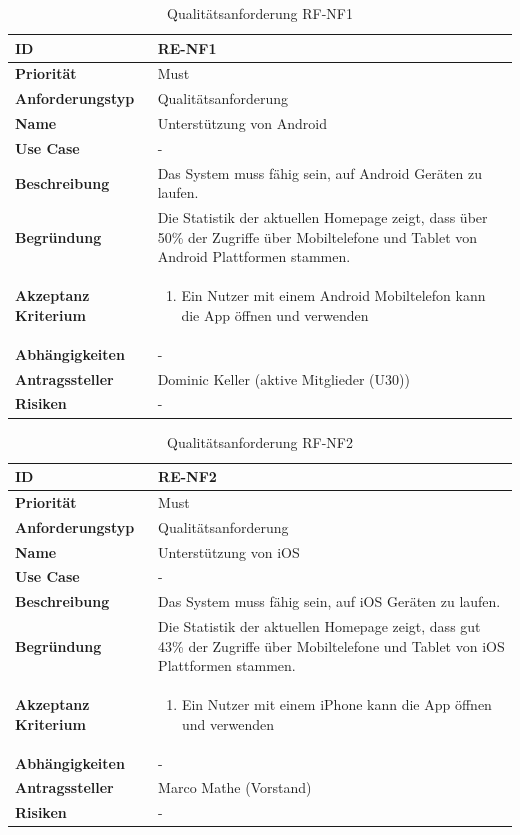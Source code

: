 \begin{table}[ht]
\centering
  \begin{tabular}{ l | p{8cm} }
	\hline
	\rowcolor{gray}
	\textbf{ID} 			&	\textbf{RE-NF1}\\ \hline
	\textbf{Priorität} 		&	Must\\ \hline
	\textbf{Anforderungstyp}	&	Qualitätsanforderung\\ \hline
	\textbf{Name} 			&	Unterstützung von Android\\ \hline
	\textbf{Use Case} 		&	-\\ \hline
	\textbf{Beschreibung} 	&	Das System muss fähig sein, auf Android Geräten zu laufen.\\ \hline
	\textbf{Begründung} 		&	Die Statistik der aktuellen Homepage zeigt, dass über 50\% der Zugriffe über Mobiltelefone und Tablet von Android Plattformen stammen.\\ \hline
	\textbf{Akzeptanz Kriterium}	&	\begin{enumerate}
					\item Ein Nutzer mit einem Android Mobiltelefon kann die App öffnen und verwenden
					\end{enumerate}
					\\ \hline
	\textbf{Abhängigkeiten} 	&	-\\ \hline
	\textbf{Antragssteller} 	&	Dominic Keller (aktive Mitglieder (U30))\\ \hline
	\textbf{Risiken}	 	&	-
  \end{tabular}
   \caption{Qualitätsanforderung RF-NF1}\label{table:req_nf_1}
\end{table}

\begin{table}[ht]
\centering
  \begin{tabular}{ l | p{8cm} }
	\hline
	\rowcolor{gray}
	\textbf{ID} 			&	\textbf{RE-NF2}\\ \hline
	\textbf{Priorität} 		&	Must\\ \hline
	\textbf{Anforderungstyp}	&	Qualitätsanforderung\\ \hline
	\textbf{Name} 			&	Unterstützung von iOS\\ \hline
	\textbf{Use Case} 		&	-\\ \hline
	\textbf{Beschreibung} 	&	Das System muss fähig sein, auf iOS Geräten zu laufen.\\ \hline
	\textbf{Begründung} 		&	Die Statistik der aktuellen Homepage zeigt, dass gut 43\% der Zugriffe über Mobiltelefone und Tablet von iOS Plattformen stammen.\\ \hline
	\textbf{Akzeptanz Kriterium}	&	\begin{enumerate}
					\item Ein Nutzer mit einem iPhone kann die App öffnen und verwenden
					\end{enumerate}
					\\ \hline
	\textbf{Abhängigkeiten} 	&	-\\ \hline
	\textbf{Antragssteller} 	&	Marco Mathe (Vorstand)\\ \hline
	\textbf{Risiken}	 	&	-
  \end{tabular}
   \caption{Qualitätsanforderung RF-NF2}\label{table:req_nf_2}
\end{table}


